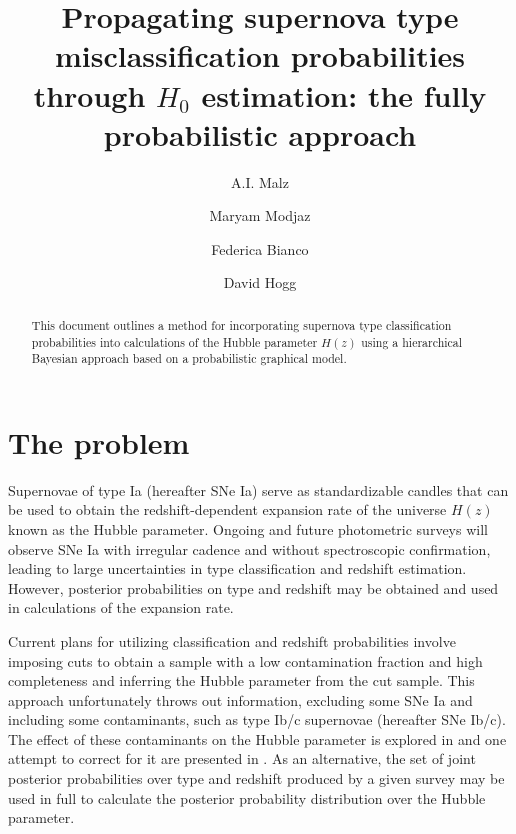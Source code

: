 \documentclass[12pt, onecolumn]{emulateapj}
\begin{document}
\title{Propagating supernova type misclassification probabilities through $H_{0}$ estimation: the fully probabilistic approach}

\author{A.I. Malz}
\author{Maryam Modjaz}
\author{Federica Bianco}
\author{David Hogg}

\begin{abstract}
This document outlines a method for incorporating supernova type classification probabilities into calculations of the Hubble parameter $H(z)$ using a hierarchical Bayesian approach based on a probabilistic graphical model.
\end{abstract}

\keywords{}

\section{The problem}
\label{sec:intro}

Supernovae of type Ia (hereafter SNe Ia) serve as standardizable candles that can be used to obtain the redshift-dependent expansion rate of the universe $H(z)$ known as the Hubble parameter.  Ongoing and future photometric surveys will observe SNe Ia with irregular cadence and without spectroscopic confirmation, leading to large uncertainties in type classification and redshift estimation.  However, posterior probabilities on type and redshift may be obtained and used in calculations of the expansion rate.  

Current plans for utilizing classification and redshift probabilities involve imposing cuts to obtain a sample with a low contamination fraction and high completeness and inferring the Hubble parameter from the cut sample.  This approach unfortunately throws out information, excluding some SNe Ia and including some contaminants, such as type Ib/c supernovae (hereafter SNe Ib/c).  The effect of these contaminants on the Hubble parameter is explored in \citet{Homeier05} and one attempt to correct for it are presented in \citet{Kessler16}.  As an alternative, the set of joint posterior probabilities over type and redshift produced by a given survey may be used in full to calculate the posterior probability distribution over the Hubble parameter.  
\end{document}
